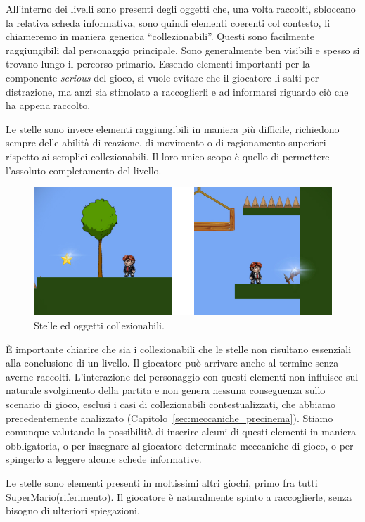 All’interno dei livelli sono presenti degli oggetti che, una volta raccolti, sbloccano la relativa scheda informativa, sono quindi elementi coerenti col contesto, li chiameremo in maniera generica “collezionabili”. Questi sono facilmente raggiungibili dal personaggio principale. Sono generalmente ben visibili e spesso si trovano lungo il percorso primario. Essendo elementi importanti per la componente \textit{serious} del gioco, si vuole evitare che il giocatore li salti per distrazione, ma anzi sia stimolato a raccoglierli e ad informarsi riguardo ciò che ha appena raccolto.

Le stelle sono invece elementi raggiungibili in maniera più difficile, richiedono sempre delle abilità di reazione, di movimento o di ragionamento superiori rispetto ai semplici collezionabili. Il loro unico scopo è quello di permettere l’assoluto completamento del livello.

\begin{figure}%
	\centering
	\includegraphics[width= 0.9\columnwidth]{images/gameDesign/25_stelle_collezionabili.jpg}
	\caption{Stelle ed oggetti collezionabili.}
	\label{fig:rigiocabilita_stelle_collezionabili}
\end{figure} 

È importante chiarire che sia i collezionabili che le stelle non risultano essenziali alla conclusione di un livello. Il giocatore può arrivare anche al termine senza averne raccolti. L’interazione del personaggio con questi elementi non influisce sul naturale svolgimento della partita e non genera nessuna conseguenza sullo scenario di gioco, esclusi i casi di collezionabili contestualizzati, che abbiamo precedentemente analizzato (Capitolo~\ref{sec:meccaniche_precinema}). Stiamo comunque valutando la possibilità di inserire alcuni di questi elementi in maniera obbligatoria, o per insegnare al giocatore determinate meccaniche di gioco, o per spingerlo a leggere alcune schede informative.

Le stelle sono elementi presenti in moltissimi altri giochi, primo fra tutti SuperMario(riferimento). Il giocatore è naturalmente spinto a raccoglierle, senza bisogno di ulteriori spiegazioni.

